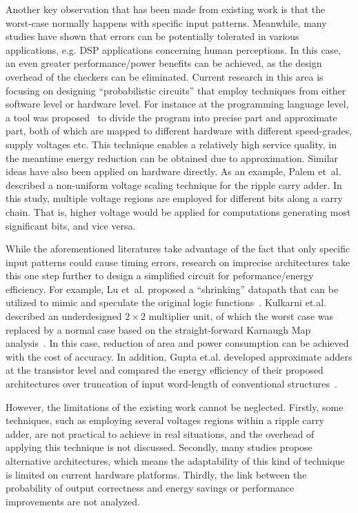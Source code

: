\documentclass[journal]{IEEEtran}
\begin{document}
Another key observation that has been made from existing work is that the worst-case normally happens with specific input patterns. Meanwhile, many studies have shown that errors can be potentially tolerated in various applications, e.g. DSP applications concerning human perceptions. In this case, an even greater performance/power benefits can be achieved, as the design overhead of the checkers can be eliminated. Current research in this area is focusing on designing ``probabilistic circuits'' that employ techniques from either software level or hardware level. For instance at the programming language level, a tool was proposed~\cite{EnerJ2011Uwash,Truffle2012Uwash} to divide the program into precise part and approximate part, both of which are mapped to different hardware with different speed-grades, supply voltages etc. This technique enables a relatively high service quality, in the meantime energy reduction can be obtained due to approximation. Similar ideas have also been applied on hardware directly. As an example, Palem et~al.~\cite{NonUniformScaling} described a non-uniform voltage scaling technique for the ripple carry adder. In this study, multiple voltage regions are employed for different bits along a carry chain. That is, higher voltage would be applied for computations generating most significant bits, and vice versa.

While the aforementioned literatures take advantage of the fact that only specific input patterns could cause timing errors, research on imprecise architectures take this one step further to design a simplified circuit for peformance/energy efficiency. For example, Lu et~al. proposed a ``shrinking'' datapath that can be utilized to mimic and speculate the original logic functions~\cite{IntelSpeeding}. Kulkarni et.al. described an underdesigned $2\times2$ multiplier unit, of which the worst case was replaced by a normal case based on the straight-forward Karnaugh Map analysis~\cite{Undersigned2x2multiplier}. In this case, reduction of area and power consumption can be achieved with the cost of accuracy. In addition, Gupta et.al. developed approximate adders at the transistor level and compared the energy efficiency of their proposed architectures over truncation of input word-length of conventional structures~\cite{Gupta2013TransCADICS}.

However, the limitations of the existing work cannot be neglected. Firstly, some techniques, such as employing several voltages regions within a ripple carry adder, are not practical to achieve in real situations, and the overhead of applying this technique is not discussed. Secondly, many studies propose alternative architectures, which means the adaptability of this kind of technique is limited on current hardware platforms. Thirdly, the link between the probability of output correctness and energy savings or performance improvements are not analyzed.
\end{document}
